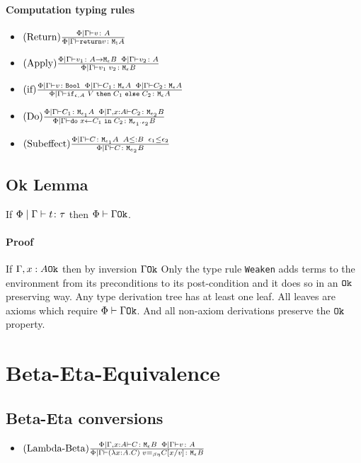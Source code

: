 {\paragraph{Computation typing rules}
\begin{itemize}
    \item $\treerule{Return}{\gpetyperelation{v}{A}}{\gpetyperelation{\return{v}}{\moa}}$
    \item $\treerule{Apply}{\gpetyperelation{v_1}{\aeb}\s\s\gpetyperelation{v_2}{A}}{\gpetyperelation{\apply{v_1}{v_2}}{\meb}}$
    \item $\treerule{if}{\gpetyperelation{v}{\B} \s\s \gpetyperelation{C_1}{\mea}\s\s\gpetyperelation{C_2}{\mea}}{\gpetyperelation{\ifthenelse{\e}{A}{V}{C_1}{C_2}}{\mea}}$
    \item $\treerule{Do}{\gpetyperelation{C_1}{\M{\e_1}{A}} \s\s \etyperelation{\P}{\gax}{C_2}{\M{\e_2}{B}}}{\gpetyperelation{\doin{x}{C_1}{C_2}}{\M{\e_1 \dot \e_2}{B}}}$
    \item $\treerule{Subeffect}{\gpetyperelation{C}{\M{\e_1}{A}}\s\s A \subtype B \s\s \e_1 \subeffect \e_2}{\gpetyperelation{C}{\M{e_2}{B}}}$
\end{itemize}

\subsection{Ok Lemma}
If $\gpetyperelation{t}{\tau}$ then $\oke{\P}{\G}$.
\paragraph{Proof}
If $\ok{\gax}$ then by inversion $\ok{\G}$
Only the type rule \texttt{Weaken} adds terms to the environment from its preconditions to its post-condition and it does so in an $\ok{}$ preserving way. Any type derivation tree has at least one leaf. All leaves are axioms which require $\oke{\P}{\G}$. And all non-axiom derivations preserve the $\ok{}$ property.


\section{Beta-Eta-Equivalence}
\subsection{Beta-Eta conversions}
\begin{itemize}
    \item $\treerule{Lambda-Beta}{\etyperelation{\P}{\gax}{C}{\meb}\s\s \gpetyperelation{v}{A}}{\gpeberelation{\apply{(\lam{x}{A}{C})}{v} }{ C\ssub{v}{x}}{\meb}}$
    

\end{itemize}}
